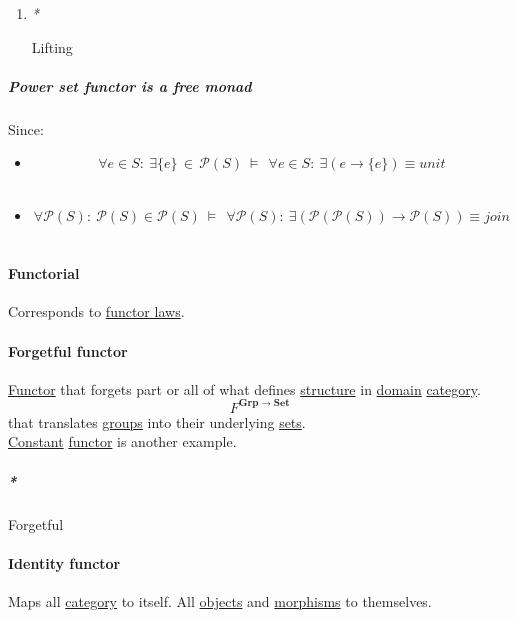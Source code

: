\documentclass[11pt]{article}
\begin{document}
\begin{enumerate}
\item \emph{*}
\label{sec:orgc6a4a85}

\label{orgc8f2687}Lifting\\
\end{enumerate}

\subparagraph{\label{org1108908}Power set functor is a free monad}
\label{sec:orgb96a45e}
Since:\\
\begin{itemize}
\item $$ \forall e \in S : \ \exists \{e\} \, \in \, {\mathcal{P}(S)} \ \vDash \ \ \forall e \in S : \ \exists (e \to \{e\}) \equiv unit $$\\
\item $$ \forall \mathcal{P}(S) : \ \mathcal{P}(S) \in \mathcal{P}(S) \ \vDash \ \ \forall \mathcal{P}(S) : \ \exists (\mathcal{P}(\mathcal{P}(S)) \to \mathcal{P}(S)) \equiv join $$\\
\end{itemize}

\paragraph{\label{org443767a}Functorial}
\label{sec:orgc5bffaa}
Corresponds to \hyperref[org5c2e0fd]{functor laws}.\\

\paragraph{\label{org261c4c8}Forgetful functor}
\label{sec:org2f8d455}
\hyperref[orgf2f6841]{Functor} that forgets part or all of what defines \hyperref[org8051f61]{structure} in \hyperref[org494b48a]{domain} \hyperref[org0450535]{category}.\\
$$ F^{\mathbf {Grp} \to \mathbf {Set}} $$ that translates \hyperref[org734e757]{groups} into their underlying \hyperref[org58ec608]{sets}.\\
\hyperref[org74b57ec]{Constant} \hyperref[orgf2f6841]{functor} is another example.\\

\subparagraph{\emph{*}}
\label{sec:orgdf05efc}

\label{org8231345}Forgetful\\

\paragraph{\label{org5a60d16}Identity functor}
\label{sec:orga07c861}
Maps all \hyperref[org0450535]{category} to itself. All \hyperref[org363acc2]{objects} and \hyperref[org6c2fa5c]{morphisms} to themselves.\\
\end{document}
